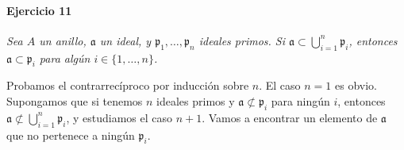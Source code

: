 \documentclass[../main.tex]{subfiles}
\begin{document}
%
%
%
%
%
%
%

\paragraph{Ejercicio 11} \textit{Sea $A$ un anillo, $\mathfrak a$ un ideal, y $\mathfrak p_1, \ldots, \mathfrak p_n$ ideales primos. Si $\mathfrak a \subset \bigcup_{i=1}^n \mathfrak p_i$, entonces $\mathfrak a \subset \mathfrak p_i$ para algún $i\in \{1, \ldots, n\}$.}

Probamos el contrarrecíproco por inducción sobre $n$. El caso $n=1$ es obvio. Supongamos que si tenemos $n$ ideales primos y $\mathfrak a \not \subset \mathfrak p_i$ para ningún $i$, entonces $\mathfrak a \not \subset \bigcup_{i=1}^n \mathfrak p_i$, y estudiamos el caso $n+1$.  Vamos a encontrar un elemento de $\mathfrak a$ que no pertenece a ningún $\mathfrak p_i$.
\end{document}
